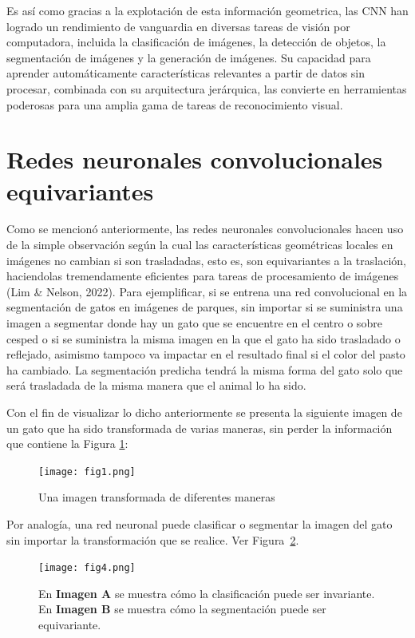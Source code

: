 \documentclass[12pt,letterpaper,final, openany]{scrbook}
\begin{document}
Es así como gracias a la explotación de esta información geometrica, las CNN han logrado un rendimiento de vanguardia en diversas tareas de visión por computadora, incluida la clasificación de imágenes, la detección de objetos, la segmentación de imágenes y la generación de imágenes. Su capacidad para aprender automáticamente características relevantes a partir de datos sin procesar, combinada con su arquitectura jerárquica, las convierte en herramientas poderosas para una amplia gama de tareas de reconocimiento visual.




\section{Redes neuronales convolucionales equivariantes}

Como se mencionó anteriormente, las redes neuronales convolucionales hacen uso de la simple observación según la cual las características geométricas locales en imágenes no cambian si son trasladadas, esto es, son equivariantes a la traslación, haciendolas tremendamente eficientes para tareas de procesamiento de imágenes (Lim \& Nelson, 2022). Para ejemplificar, si se entrena una red convolucional en la segmentación de gatos en imágenes de parques, sin importar si se suministra una imagen a segmentar donde hay un gato que se encuentre en el centro o sobre cesped o si se suministra la misma imagen en la que el gato ha sido trasladado o reflejado, asimismo tampoco va impactar en el resultado final si el color del pasto ha cambiado. La segmentación predicha tendrá la misma forma del gato solo que será trasladada de la misma manera que el animal lo ha sido.

Con el fin de visualizar lo dicho anteriormente se presenta la siguiente imagen de un gato que ha sido transformada de varias maneras, sin perder la información que contiene la Figura \ref{fig:cat}:
\begin{figure}[h!]
\texttt{[image: fig1.png]}
\caption{Una imagen transformada de diferentes maneras}
\label{fig:cat}
\end{figure}


Por analogía, una red neuronal puede clasificar o segmentar la imagen del gato sin importar la transformación que se realice. Ver Figura~\ref{fig:cat_segmentation}.

\begin{figure}[h!]
    \centering
    \texttt{[image: fig4.png]}
    \caption{En \textbf{Imagen A} se muestra cómo la clasificación puede ser invariante.
    En \textbf{Imagen B} se muestra cómo la segmentación puede ser equivariante.}
    \label{fig:cat_segmentation}
\end{figure}
\end{document}
